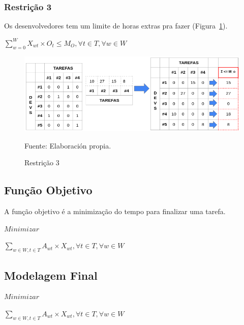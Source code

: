 \documentclass[12pt]{article}
\begin{document}
\subsubsection{Restrição 3}

Os desenvolvedores tem um limite de horas extras pra fazer (Figura~\ref{figure:constraint_3}).

\begin{center}\Large
	${\sum_{w=0}^{W} X_{wt} \times O_t \leq M_O} , \forall t \in T, \forall w \in W$
\end{center}

\begin{figure}[!ht]
	\begin{center}
		\includegraphics[width=1\textwidth]{images/constraint_3}
	\end{center}
	\begin{center}
		\caption{\label{figure:constraint_3}
			\small{Restrição 3}}
		{\small{Fuente: Elaboración propia.}}
	\end{center}
\end{figure}


\subsection{Função Objetivo}

A função objetivo é a minimização do tempo para finalizar uma tarefa. 

\begin{center}
${Minimizar}$
\end{center}
\begin{center}\Large
	 ${\sum_{w \in W, t \in T} A_{wt} \times X_{wt}} , \forall t \in T, \forall w \in W$
\end{center}

\subsection{Modelagem Final}

\begin{center}
	${Minimizar}$
\end{center}
\begin{center}\Large
	${\sum_{w \in W, t \in T} A_{wt} \times X_{wt}} , \forall t \in T, \forall w \in W$
\end{center}
\end{document}
